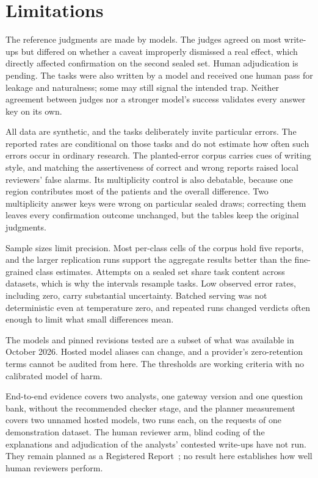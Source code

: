 \section{Limitations}
\label{sec:limitations}

The reference judgments are made by models. The judges agreed on most write-ups but differed on whether a caveat improperly dismissed a real effect, which directly affected confirmation on the second sealed set. Human adjudication is pending. The tasks were also written by a model and received one human pass for leakage and naturalness; some may still signal the intended trap. Neither agreement between judges nor a stronger model's success validates every answer key on its own.

All data are synthetic, and the tasks deliberately invite particular errors. The reported rates are conditional on those tasks and do not estimate how often such errors occur in ordinary research. The planted-error corpus carries cues of writing style, and matching the assertiveness of correct and wrong reports raised local reviewers' false alarms. Its multiplicity control is also debatable, because one region contributes most of the patients and the overall difference. Two multiplicity answer keys were wrong on particular sealed draws; correcting them leaves every confirmation outcome unchanged, but the tables keep the original judgments.

Sample sizes limit precision. Most per-class cells of the corpus hold five reports, and the larger replication runs support the aggregate results better than the fine-grained class estimates. Attempts on a sealed set share task content across datasets, which is why the intervals resample tasks. Low observed error rates, including zero, carry substantial uncertainty. Batched serving was not deterministic even at temperature zero, and repeated runs changed verdicts often enough to limit what small differences mean.

The models and pinned revisions tested are a subset of what was available in October 2026. Hosted model aliases can change, and a provider's zero-retention terms cannot be audited from here. The thresholds are working criteria with no calibrated model of harm.

End-to-end evidence covers two analysts, one gateway version and one question bank, without the recommended checker stage, and the planner measurement covers two unnamed hosted models, two runs each, on the requests of one demonstration dataset. The human reviewer arm, blind coding of the explanations and adjudication of the analysts' contested write-ups have not run. They remain planned as a Registered Report~\cite{chambers2022rr}; no result here establishes how well human reviewers perform.
